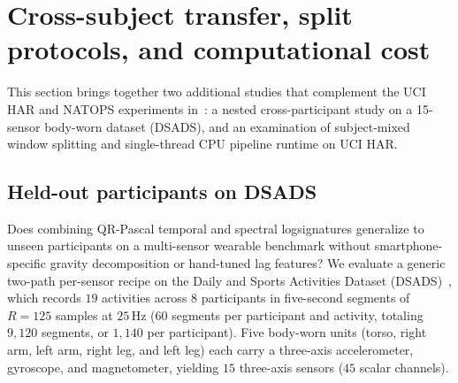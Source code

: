 \section{Cross-subject transfer, split protocols, and computational cost}
\label{app:additional}

This section brings together two additional studies that complement the UCI HAR
and NATOPS experiments in~\cite{mainpaper}: a nested cross-participant study on
a 15-sensor body-worn dataset (DSADS), and an examination of subject-mixed
window splitting and single-thread CPU pipeline runtime on UCI HAR.

\subsection{Held-out participants on DSADS}\label{app:transfer}
Does combining QR-Pascal temporal and spectral logsignatures generalize to unseen
participants on a multi-sensor wearable benchmark without smartphone-specific
gravity decomposition or hand-tuned lag features? We evaluate a generic two-path
per-sensor recipe on the Daily and Sports Activities Dataset (DSADS)~\cite{dsads},
which records \(19\) activities across \(8\) participants in five-second segments
of \(R = 125\) samples at \(25\,\mathrm{Hz}\) (\(60\) segments per participant and
activity, totaling \(9{,}120\) segments, or \(1{,}140\) per participant). Five
body-worn units (torso, right arm, left arm, right leg, and left leg) each carry
a three-axis accelerometer, gyroscope, and magnetometer, yielding \(15\)
three-axis sensors (\(45\) scalar channels).

